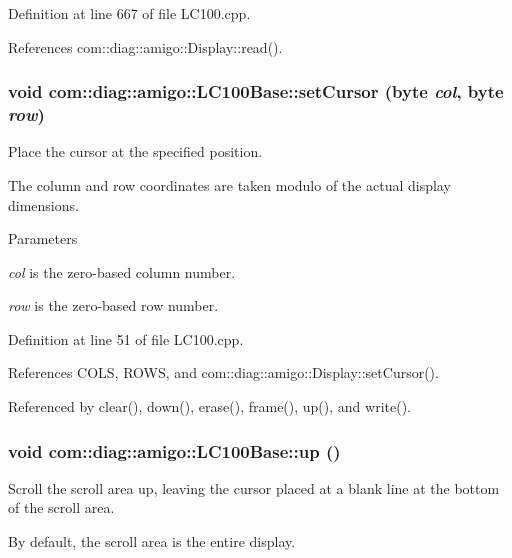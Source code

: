 Definition at line 667 of file LC100.cpp.



References com::diag::amigo::Display::read().

\hypertarget{classcom_1_1diag_1_1amigo_1_1LC100Base_aadfb19a306738b52afb990734a412b94}{
\subsubsection[{setCursor}]{\setlength{\rightskip}{0pt plus 5cm}void com::diag::amigo::LC100Base::setCursor (byte {\em col}, \/  byte {\em row})}}
\label{classcom_1_1diag_1_1amigo_1_1LC100Base_aadfb19a306738b52afb990734a412b94}


Place the cursor at the specified position. 

The column and row coordinates are taken modulo of the actual display dimensions. 
\begin{DoxyParams}{Parameters}
\item[{\em col}]is the zero-\/based column number. \item[{\em row}]is the zero-\/based row number. \end{DoxyParams}


Definition at line 51 of file LC100.cpp.



References COLS, ROWS, and com::diag::amigo::Display::setCursor().



Referenced by clear(), down(), erase(), frame(), up(), and write().

\hypertarget{classcom_1_1diag_1_1amigo_1_1LC100Base_a836be0f28470396a23a3c28ef835c33d}{
\subsubsection[{up}]{\setlength{\rightskip}{0pt plus 5cm}void com::diag::amigo::LC100Base::up ()}}
\label{classcom_1_1diag_1_1amigo_1_1LC100Base_a836be0f28470396a23a3c28ef835c33d}


Scroll the scroll area up, leaving the cursor placed at a blank line at the bottom of the scroll area. 

By default, the scroll area is the entire display. 

